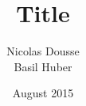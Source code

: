 \documentclass[paper=a4, twocolumn]{article}
\begin{document}
\title{Title}
\author{Nicolas Dousse\\Basil Huber }
\date{August 2015}


\twocolumn[
	\maketitle
	\begin{abstract}
	
	\vspace{10pt}
	\end{abstract}
]












\printbibliography[title=References]
\end{document}
